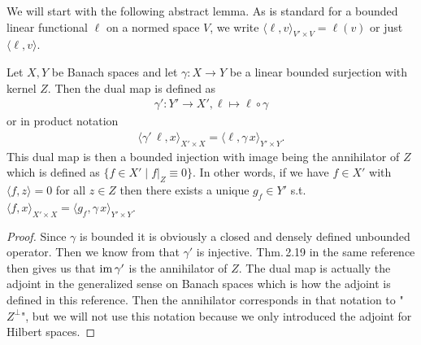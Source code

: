 \documentclass[../master_thesis.tex]{subfiles}
\begin{document}
\begin{remark}
\end{remark}

We will start with the following abstract lemma. As is standard for a bounded linear 
functional $\ell$ on a normed space $V$, we write $\langle \ell, v \rangle_{V'\times V} = \ell(v)$ 
or just $\langle \ell, v \rangle$.

\begin{lemma}\label{lem:dual_map_of_surjective_operator}
    Let $X, Y$ be Banach spaces and let $\gamma: X \rightarrow Y$ be a 
    linear bounded surjection with kernel $Z$. Then the dual map is defined as
    \begin{align*}
        \gamma': Y' \rightarrow X', \ell \mapsto \ell \circ \gamma
    \end{align*}
    or in product notation
    \begin{align*}
        \langle \gamma' \, \ell, x \rangle_{X' \times X} = \langle \ell, \gamma\,x \rangle_{Y'\times Y}.
    \end{align*}
    This dual map is then a bounded injection with image 
    being the annihilator of $Z$ which is defined as 
    $\{ f \in X' \mid f|_Z \equiv 0 \}$. In other words, if we have $f \in X'$
    with $\langle f, z \rangle = 0$ for all $z \in Z$ then there exists a unique 
    $g_f \in Y'$ s.t. $\langle f, x \rangle_{X' \times X} = \langle g_f, \gamma \, x \rangle_{Y'\times Y}$.
\end{lemma}
\begin{proof}
    Since $\gamma$ is bounded it is obviously a closed and densely defined 
    unbounded operator. Then we know from \cite[Thm.\,2.20]{brezis} that 
    $\gamma'$ is injective. Thm.\,2.19 in the same reference 
    then gives us that $\operatorname{im} \gamma'$ is the annihilator of $Z$. 
    The dual map is actually the adjoint in the generalized sense on Banach spaces 
    which is how the adjoint is defined in this reference. Then the 
    annihilator corresponds in that notation to "$Z^\perp$", but we will not use 
    this notation because we only introduced the adjoint for Hilbert spaces.
\end{proof}
\end{document}
